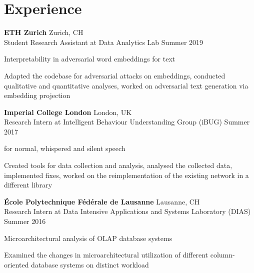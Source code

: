 \section{Experience}

\begin{outerlist}

\item \textbf{ETH Zurich} \hfill
	Zurich, CH \\
	Student Research Assistant at Data Analytics Lab \hfill
	Summer 2019

	\begin{innerlist}
		\item Interpretability in adversarial word embeddings for text
		\detail \item Adapted the codebase for adversarial attacks on embeddings, conducted qualitative and quantitative analyses, worked on adversarial text generation via embedding projection
	\end{innerlist}

\item \textbf{Imperial College London} \hfill
	London, UK \\
	Research Intern at Intelligent Behaviour Understanding Group (iBUG) \hfill
	Summer 2017

	\begin{innerlist}
		\item {} for normal, whispered and silent speech
		\detail \item Created tools for data collection and analysis, analysed the collected data, implemented fixes, worked on the reimplementation of the existing network in a different library
	\end{innerlist}

\item \textbf{École Polytechnique Fédérale de Lausanne} \hfill
	Lausanne, CH \\
	Research Intern at Data Intensive Applications and Systems Laboratory (DIAS) \hfill
	Summer 2016

	\begin{innerlist}
		\item Microarchitectural analysis of OLAP database systems
		\detail \item Examined the changes in microarchitectural utilization of different column-oriented database systems on distinct workload
	\end{innerlist}

\end{outerlist}
